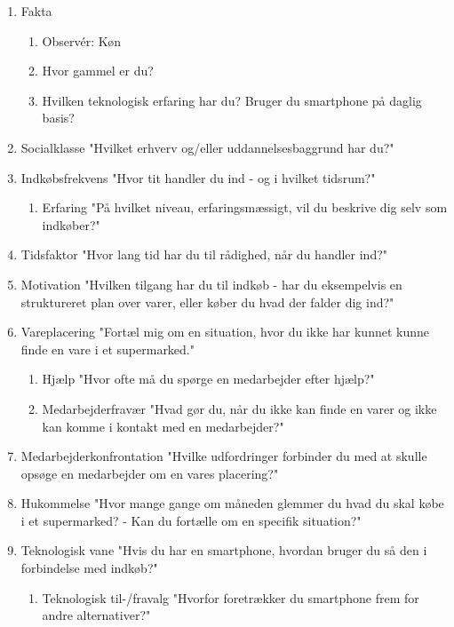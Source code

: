 \documentclass[12pt]{article}
\begin{document}
\begin{enumerate}
\item Fakta
\begin{enumerate}
\item Observér: Køn
\item Hvor gammel er du?
\item Hvilken teknologisk erfaring har du? Bruger du smartphone på daglig basis?
\end{enumerate}

\item Socialklasse "Hvilket erhverv og/eller uddannelsesbaggrund har du?"

\item Indkøbsfrekvens "Hvor tit handler du ind - og i hvilket tidsrum?"

\begin{enumerate}
\item Erfaring	"På hvilket niveau, erfaringsmæssigt, vil du beskrive dig selv som indkøber?"
\end{enumerate}

\item Tidsfaktor "Hvor lang tid har du til rådighed, når du handler ind?"
\item Motivation "Hvilken tilgang har du til indkøb - har du eksempelvis en struktureret plan over varer, eller køber du hvad der falder dig ind?"
\item Vareplacering "Fortæl mig om en situation, hvor du ikke har kunnet kunne finde en vare i et supermarked."

\begin{enumerate}
\item Hjælp "Hvor ofte må du spørge en medarbejder efter hjælp?"
\item Medarbejderfravær "Hvad gør du, når du ikke kan finde en varer og ikke kan komme i kontakt med en medarbejder?"
\end{enumerate}

\item Medarbejderkonfrontation "Hvilke udfordringer forbinder du med at skulle opsøge en medarbejder om en vares placering?"
\item Hukommelse "Hvor mange gange om måneden glemmer du hvad du skal købe i et supermarked? - Kan du fortælle om en specifik situation?"
\item Teknologisk vane "Hvis du har en smartphone, hvordan bruger du så den i forbindelse med indkøb?"

\begin{enumerate}
\item Teknologisk til-/fravalg "Hvorfor foretrækker du smartphone frem for andre alternativer?"
\end{enumerate}


\end{enumerate}
\end{document}
